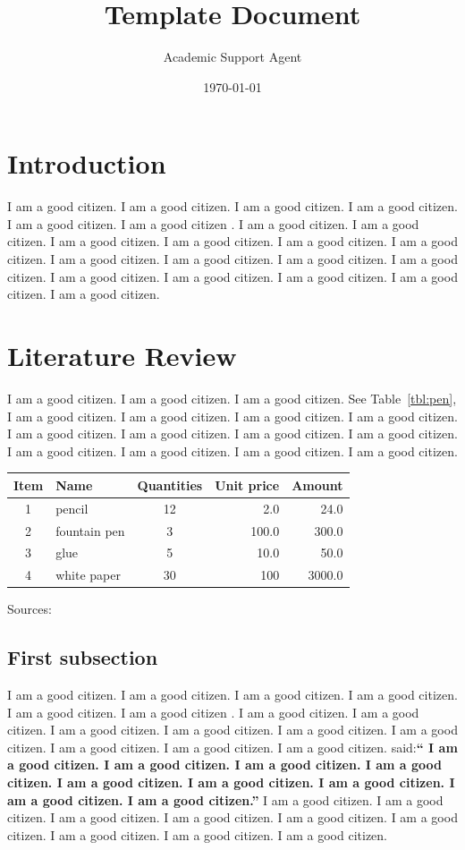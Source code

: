 \documentclass{article}
\title{Template Document}
\author{Academic Support Agent}
\date{\today}
\begin{document}
\maketitle

\section{Introduction}
I am a good citizen. I am a good citizen. I am a good citizen.
I am a good citizen. I am a good citizen. I am a good citizen \autocite{dirac}.
I am a good citizen. I am a good citizen. I am a good citizen.
I am a good citizen. I am a good citizen. I am a good citizen.
I am a good citizen. I am a good citizen. I am a good citizen.
I am a good citizen. I am a good citizen. I am a good citizen.
I am a good citizen. I am a good citizen. I am a good citizen.


\section{Literature Review}

I am a good citizen. I am a good citizen. I am a good citizen.
See Table~\ref{tbl:pen},
I am a good citizen. I am a good citizen. I am a good citizen.
I am a good citizen. I am a good citizen. I am a good citizen.
I am a good citizen. I am a good citizen. I am a good citizen.
I am a good citizen. I am a good citizen. I am a good citizen.

{
\begin{tabular}{clcrr}
\toprule
Item & Name & Quantities & Unit price & Amount \\
\midrule
1 & pencil  & 12 & 2.0 & 24.0 \\
2 & fountain pen & 3 & 100.0& 300.0 \\
3 & glue & 5 & 10.0 & 50.0 \\
4 & white paper & 30 & 100 & 3000.0\\
\bottomrule
\end{tabular}}
{Sources: }

\subsection{First subsection}
I am a good citizen. I am a good citizen. I am a good citizen.
I am a good citizen. I am a good citizen.
I am a good citizen \autocite{knuth-fa}.
I am a good citizen. I am a good citizen. I am a good citizen.
I am a good citizen. I am a good citizen. I am a good citizen.
I am a good citizen. I am a good citizen. I am a good citizen.
\textcite{einstein} said:\textbf{``
I am a good citizen. I am a good citizen. I am a good citizen.
I am a good citizen. I am a good citizen. I am a good citizen.
I am a good citizen. I am a good citizen. I am a good citizen.''}
I am a good citizen. I am a good citizen. I am a good citizen.
I am a good citizen. I am a good citizen. I am a good citizen.
I am a good citizen. I am a good citizen. I am a good citizen.
\end{document}
